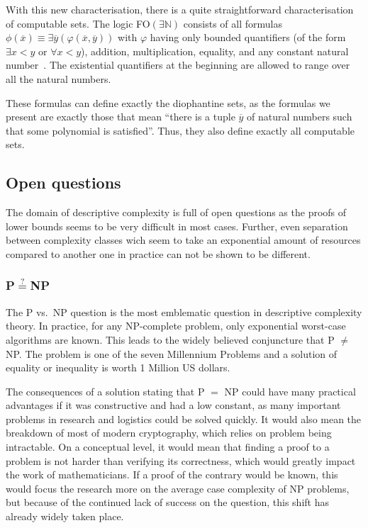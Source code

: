 With this new characterisation, there is a quite straightforward characterisation of computable sets.
The logic FO$(\exists \mathbb{N})$ consists of all formulas $\phi(\overline{x}) \equiv \exists \overline{y} (\varphi(\overline{x}, \overline{y}))$ with $\varphi$ having only bounded quantifiers (of the form $\exists x < y$ or $\forall x < y$), addition, multiplication, equality, and any constant natural number~\cite{Entropy2020}.
The existential quantifiers at the beginning are allowed to range over all the natural numbers.

These formulas can define exactly the diophantine sets, as the formulas we present are exactly those that mean ``there is a tuple $\overline{y}$ of natural numbers such that some polynomial is satisfied''.
Thus, they also define exactly all computable sets.

\subsection{Open questions}\label{sec:open-questions}

The domain of descriptive complexity is full of open questions as the proofs of lower bounds seems to be very difficult in most cases.
Further, even separation between complexity classes wich seem to take an exponential amount of resources compared to another one in practice can not be shown to be different.

\subsubsection{P$\overset{?}{=}$NP}\label{subsec:pnp}
The P vs.~NP question is the most emblematic question in descriptive complexity theory.
In practice, for any NP-complete problem, only exponential worst-case algorithms are known.
This leads to the widely believed conjuncture that P $\neq$ NP\@.
The problem is one of the seven Millennium Problems and a solution of equality or inequality is worth 1 Million US dollars.

The consequences of a solution stating that P $=$ NP could have many practical advantages if it was constructive and had a low constant, as many important problems in research and logistics could be solved quickly.
It would also mean the breakdown of most of modern cryptography, which relies on problem being intractable.
On a conceptual level, it would mean that finding a proof to a problem is not harder than verifying its correctness, which would greatly impact the work of mathematicians.
If a proof of the contrary would be known, this would focus the research more on the average case complexity of NP problems, but because of the continued lack of success on the question, this shift has already widely taken place.

